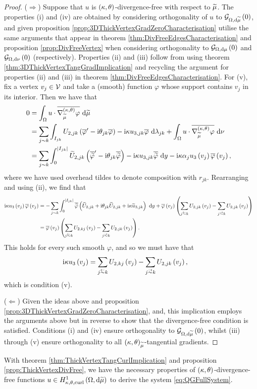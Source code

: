 \begin{proof}
	($\Rightarrow$) Suppose that $u$ is $\left( \kappa, \theta \right)$-divergence-free with respect to $\widetilde{\mu}$.
	The properties (i) and (iv) are obtained by considering orthogonality of $u$ to $\mathcal{G}_{ \Omega, \mathrm{d}\widetilde{\mu}}\left( 0 \right)$, and given proposition \ref{prop:3DThickVertexGradZeroCharacterisation} utilise the same arguments that appear in theorem \ref{thm:DivFreeEdgesCharacterisation} and proposition \ref{prop:DivFreeVertex} when considering orthogonality to $\mathcal{G}_{ \Omega, \mathrm{d}\mu}\left( 0 \right)$ and $\mathcal{G}_{ \Omega, \mathrm{d}\nu}\left( 0 \right)$ (respectively).
	Properties (ii) and (iii) follow from using theorem \ref{thm:3DThickVertexTangGradImplication} and recycling the argument for properties (ii) and (iii) in theorem \ref{thm:DivFreeEdgesCharacterisation}.
	For (v), fix a vertex $v_j\in\mathcal{V}$ and take a (smooth) function $\varphi$ whose support contains $v_j$ in its interior.
	Then we have that
	\begin{align*}
		0 &= \int_{\Omega} u\cdot\overline{\nabla^{\left( \kappa, \theta \right)}_{\widetilde{\mu}}\varphi}  \ \mathrm{d}\widetilde{\mu} \\
		&= \sum_{j\sim k}\int_{I_{jk}} U_{2,jk}\left( \overline{\varphi}' - \mathrm{i}\theta_{jk}\overline{\varphi} \right) - \mathrm{i}\kappa u_{3,jk}\overline{\varphi}  \ \mathrm{d}\lambda_{jk} + \int_{\Omega} u\cdot\overline{\nabla^{\left( \kappa, \theta \right)}_{\widetilde{\mu}}\varphi}  \ \mathrm{d}\nu \\
		&= \sum_{j\sim k}\int_0^{\left\lvert I_{jk} \right\rvert} \widetilde{U}_{2,jk}\left( \overline{\widetilde{\varphi}}' - \mathrm{i}\theta_{jk}\overline{\widetilde{\varphi}} \right) - \mathrm{i}\kappa u_{3,jk}\overline{\widetilde{\varphi}} \ \mathrm{d} y
		-\mathrm{i}\kappa\alpha_j u_3\left( v_j \right)\overline{\varphi}\left( v_j \right),
	\end{align*}
	where we have used overhead tildes to denote composition with $r_{jk}$.
	Rearranging and using (ii), we find that
	\begin{align*}
		\rmi\wavenumber u_3\bracs{v_j}\overline{\varphi}\bracs{v_j}
		&= - \sum_{j\con k}\int_0^{\abs{I_{jk}}} \overline{\widetilde{\varphi}}\bracs{ \widetilde{U}_{2,jk} + \rmi\qm_{jk}\widetilde{U}_{2,jk} + \rmi\wavenumber\widetilde{u}_{3,jk} } \ \md y + \overline{\varphi}\bracs{v_j}\bracs{ \sum_{j\conRight k} U_{2,jk}\bracs{v_j} - \sum_{j\conLeft k} U_{2,jk}\bracs{v_j} } \\
		&= \overline{\varphi}\bracs{v_j}\bracs{ \sum_{j\conRight k} U_{2,kj}\bracs{v_j} - \sum_{j\conLeft k} U_{2,jk}\bracs{v_j} }.
	\end{align*}
	This holds for every such smooth $\varphi$, and so we must have that
	\begin{align*}
		\rmi\wavenumber u_3\bracs{v_j} &= \sum_{j\conRight k} U_{2,kj}\bracs{v_j} - \sum_{j\conLeft k} U_{2,jk}\bracs{v_j},
	\end{align*}
	which is condition (v).
	
	($\Leftarrow$) Given the ideas above and proposition \ref{prop:3DThickVertexGradZeroCharacterisation}, and, this implication employs the arguments above but in reverse to show that the divergence-free condition is satisfied. 
	Conditions (i) and (iv) ensure orthogonality to $\mathcal{G}_{ \Omega, \mathrm{d}\widetilde{\mu}}\left( 0 \right)$, whilst (iii) through (v) ensure orthogonality to all $\left( \kappa, \theta \right)_{\widetilde{\mu}}$-tangential gradients.
\end{proof}

With theorem \ref{thm:ThickVertexTangCurlImplication} and proposition \ref{prop:ThickVertexDivFree}, we have the necessary properties of $\left( \kappa, \theta \right)$-divergence-free functions $u\in H^1_{\kappa,\theta,\mathrm{curl}}\left( \Omega, \mathrm{d}\widetilde{\mu} \right)$ to derive the system \eqref{eq:QGFullSystem}.